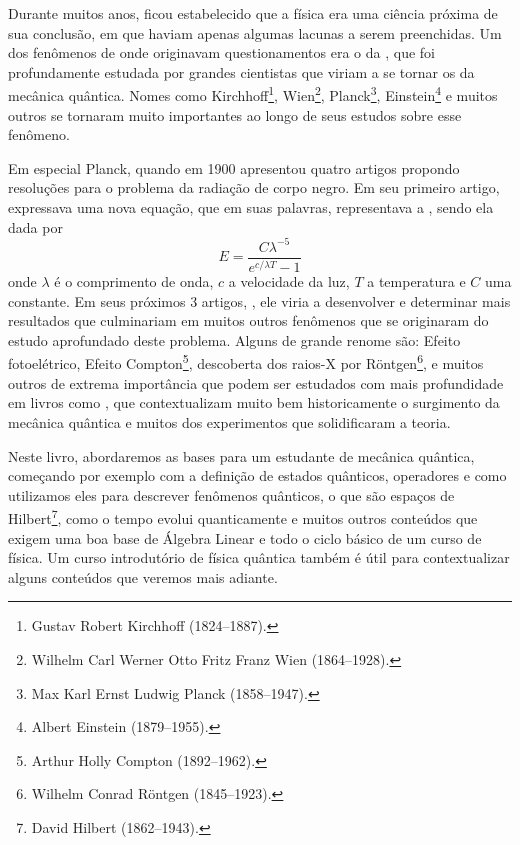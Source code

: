 Durante muitos anos, ficou estabelecido que a física era uma ciência próxima de sua conclusão, em que haviam apenas algumas lacunas a serem preenchidas. Um dos fenômenos de onde originavam questionamentos era o da , que foi profundamente estudada por grandes cientistas que viriam a se tornar os  da mecânica quântica. Nomes como Kirchhoff\footnote{Gustav Robert Kirchhoff (1824--1887).}, Wien\footnote{Wilhelm Carl Werner Otto Fritz Franz Wien (1864--1928).}, Planck\footnote{Max Karl Ernst Ludwig Planck (1858--1947).}, Einstein\footnote{Albert Einstein (1879--1955).} e muitos outros se tornaram muito importantes ao longo de seus estudos sobre esse fenômeno.

Em especial Planck, quando em 1900 apresentou quatro artigos propondo resoluções para o problema da radiação de corpo negro. Em seu primeiro artigo, \textcite{Planck1} expressava uma nova equação, que em suas palavras, representava a , sendo ela dada por
    \begin{equation*}
        E = \dfrac{C\lambda^{-5}}{e^{c/\lambda T} - 1}
    \end{equation*}
onde $\lambda$ é o comprimento de onda, $c$ a velocidade da luz, $T$ a temperatura e $C$ uma constante. Em seus próximos 3 artigos, \textcite{Planck2, Planck3, Planck4}, ele viria a desenvolver e determinar mais resultados que culminariam em muitos outros fenômenos que se originaram do estudo aprofundado deste problema. Alguns de grande renome são: Efeito fotoelétrico, Efeito Compton\footnote{Arthur Holly Compton (1892--1962).}, descoberta dos raios-X por Röntgen\footnote{Wilhelm Conrad Röntgen (1845--1923).}, e muitos outros de extrema importância que podem ser estudados com mais profundidade em livros como \textcite{Eisberg}, que contextualizam muito bem historicamente o surgimento da mecânica quântica e muitos dos experimentos que solidificaram a teoria.

Neste livro, abordaremos as bases para um estudante de mecânica quântica, começando por exemplo com a definição de estados quânticos, operadores e como utilizamos eles para descrever fenômenos quânticos, o que são espaços de Hilbert\footnote{David Hilbert (1862--1943).}, como o tempo evolui quanticamente e muitos outros conteúdos que exigem uma boa base de Álgebra Linear e todo o ciclo básico de um curso de física. Um curso introdutório de física quântica também é útil para contextualizar alguns conteúdos que veremos mais adiante.

